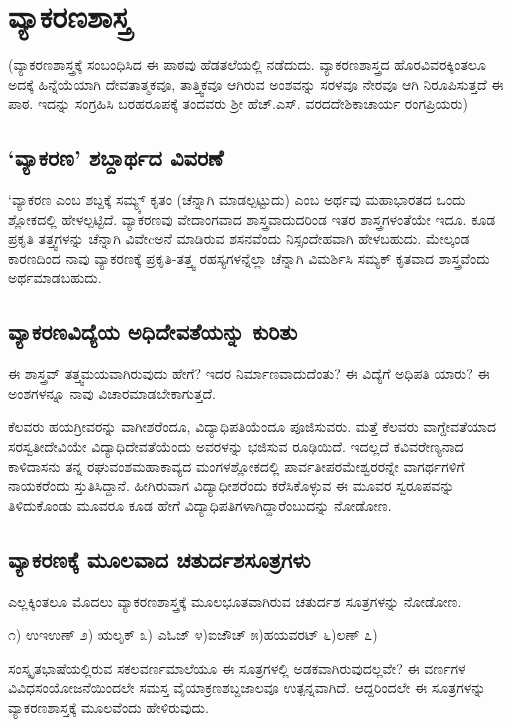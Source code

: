 \chapter{ವ್ಯಾಕರಣಶಾಸ್ತ್ರ}

(ವ್ಯಾಕರಣಶಾಸ್ತ್ರಕ್ಕೆ ಸಂಬಂಧಿಸಿದ ಈ ಪಾಠವು  ಹೆಡತಲೆಯಲ್ಲಿ ನಡೆದುದು. ವ್ಯಾಕರಣಶಾಸ್ತ್ರದ ಹೊರವಿವರಕ್ಕಿಂತಲೂ ಅದಕ್ಕೆ ಹಿನ್ನೆಯೆಯಾಗಿ ದೇವತಾತ್ಮಕವೂ, ತಾತ್ತ್ವಿಕವೂ ಆಗಿರುವ ಅಂಶವನ್ನು ಸರಳವೂ ನೇರವೂ ಆಗಿ ನಿರೂಪಿಸುತ್ತದೆ ಈ ಪಾಠ. ಇದನ್ನು ಸಂಗ್ರಹಿಸಿ ಬರಹರೂಪಕ್ಕೆ ತಂದವರು ಶ್ರೀ ಹೆಚ್.ಎಸ್. ವರದದೇಶಿಕಾಚಾರ್ಯ ರಂಗಪ್ರಿಯರು)

\section*{`ವ್ಯಾಕರಣ' ಶಬ್ದಾರ್ಥದ ವಿವರಣೆ}

`ವ್ಯಾಕರಣ ಎಂಬ ಶಬ್ದಕ್ಕೆ ಸಮ್ಯ್ಕ್ ಕೃತಂ (ಚೆನ್ನಾಗಿ ಮಾಡಲ್ಪಟ್ಟುದು) ಎಂಬ ಅರ್ಥವು ಮಹಾಭಾರತದ ಒಂದು ಶ್ಲೋಕದಲ್ಲಿ ಹೇಳಲ್ಪಟ್ಟಿದೆ. ವ್ಯಾಕರಣವು  ವೇದಾಂಗವಾದ ಶಾಸ್ತ್ರವಾದುದರಿಂಡ ಇತರ ಶಾಸ್ತ್ರಗಳಂತೆಯೇ ಇದೂ. ಕೂಡ ಪ್ರಕೃತಿ ತತ್ತ್ವಗಳನ್ನು ಚೆನ್ನಾಗಿ ವಿವೇcಅನೆ ಮಾಡಿರುವ ಶಸನವೆಂದು ನಿಸ್ಸಂದೇಹವಾಗಿ ಹೇಳಬಹುದು. ಮೇಲ್ಕಂಡ ಕಾರಣದಿಂದ ನಾವು ವ್ಯಾಕರಣಕ್ಕೆ ಪ್ರಕೃತಿ-ತತ್ತ್ವ  ರಹಸ್ಯಗಳನ್ನೆಲ್ಲಾ ಚೆನ್ನಾಗಿ ವಿಮರ್ಶಿಸಿ ಸಮ್ಯಕ್ ಕೃತವಾದ ಶಾಸ್ತ್ರವೆಂದು ಅರ್ಥಮಾಡಬಹುದು.

\section*{ವ್ಯಾಕರಣವಿದ್ಯೆಯ ಅಧಿದೇವತೆಯನ್ನು ಕುರಿತು}

ಈ ಶಾಸ್ತ್ರವ್ ತತ್ತ್ವಮಯವಾಗಿರುವುದು ಹೇಗೆ? ಇದರ ನಿರ್ಮಾಣವಾದುದೆಂತು? ಈ ವಿದ್ಯೆಗೆ ಅಧಿಪತಿ  ಯಾರು? ಈ ಅಂಶಗಳನ್ನೂ ನಾವು ವಿಚಾರಮಾಡಬೇಕಾಗುತ್ತದೆ.

ಕೆಲವರು ಹಯಗ್ರೀವರನ್ನು ವಾಗೀಶರೆಂದೂ, ವಿದ್ಯಾಧಿಪತಿಯೆಂದೂ ಪೂಜಿಸುವರು. ಮತ್ತೆ ಕೆಲವರು ವಾಗ್ದೇವತೆಯಾದ ಸರಸ್ವತೀದೇವಿಯೇ ವಿದ್ಯಾಧಿದೇವತೆಯೆಂದು ಅವರಳನ್ನು ಭಜಿಸುವ ರೂಢಿಯಿದೆ. ಇದಲ್ಲದೆ ಕವಿವರೇಣ್ಯನಾದ ಕಾಳಿದಾಸನು ತನ್ನ ರಘುವಂಶಮಹಾಕಾವ್ಯದ ಮಂಗಳಶ್ಲೋಕದಲ್ಲಿ ಪಾರ್ವತೀಪರಮೇಶ್ವರರನ್ನೇ ವಾಗರ್ಥಗಳಿಗೆ ನಾಯಕರೆಂದು ಸ್ತುತಿಸಿದ್ದಾನೆ. ಹೀಗಿರುವಾಗ ವಿದ್ಯಾಧೀಶರೆಂದು ಕರೆಸಿಕೊಳ್ಳುವ ಈ ಮೂವರ ಸ್ವರೂಪವನ್ನು ತಿಳಿದುಕೊಂಡು ಮೂವರೂ ಕೂಡ ಹೇಗೆ ವಿದ್ಯಾಧಿಪತಿಗಳಾಗಿದ್ದಾರೆಂಬುದನ್ನು ನೋಡೋಣ.

\section*{ವ್ಯಾಕರಣಕ್ಕೆ ಮೂಲವಾದ ಚತುರ್ದಶಸೂತ್ರಗಳು}

ಎಲ್ಲಕ್ಕಿಂತಲೂ ಮೊದಲು ವ್ಯಾಕರಣಶಾಸ್ತ್ರಕ್ಕೆ  ಮೂಲಭೂತವಾಗಿರುವ ಚತುರ್ದಶ ಸೂತ್ರಗಳನ್ನು ನೋಡೋಣ.

೧) ಉಇಉಣ್  ೨) ಋಲೃಕ್ ೩) ಎಓಜ್ ೪)ಐಜೌಚ್ ೫)ಹಯವರಟ್ ೬)ಲಣ್  ೭) 


ಸಂಸ್ಕೃತಭಾಷೆಯಲ್ಲಿರುವ ಸಕಲವರ್ಣಮಾಲೆಯೂ ಈ ಸೂತ್ರಗಳಲ್ಲಿ ಅಡಕವಾಗಿರುವುದಲ್ಲವೇ? ಈ ವರ್ಣಗಳ ವಿವಿಧಸಂಯೋಜನೆಯಿಂದಲೇ ಸಮಸ್ತ ವೈಯಾಕ್ರಣಶಬ್ದಜಾಲವೂ ಉತ್ಪನ್ನವಾಗಿದೆ. ಆದ್ದರಿಂದಲೇ ಈ ಸೂತ್ರಗಳನ್ನು ವ್ಯಾಕರಣಶಾಸ್ತಕ್ಕೆ ಮೂಲವೆಂದು ಹೇಳಿರುವುದು.

